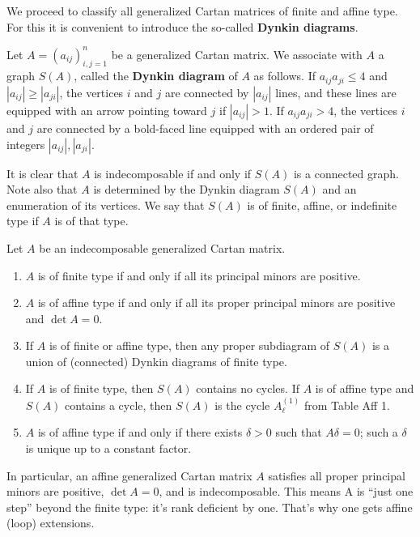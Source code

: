 \documentclass[12pt]{article}
\begin{document}
We proceed to classify all generalized Cartan matrices of finite and affine type.
For this it is convenient to introduce the so-called \textbf{Dynkin diagrams}.
\begin{definition}
    Let $A=(a_{ij})_{i,j=1}^n$ be a generalized Cartan matrix.  We associate with $A$ a graph $S(A)$, called the \textbf{Dynkin diagram} of $A$ as follows. If $a_{ij}a_{ji}\leq 4$ and $|a_{ij}|\geq |a_{ji}|$, the vertices $i$ and $j$ are connected by $|a_{ij}|$ lines, and these lines are equipped with an arrow pointing toward $j$ if $|a_{ij}|>1$.
    If $a_{ij}a_{ji}>4$, the vertices $i$ and $j$ are connected by a bold-faced line
    equipped with an ordered pair of integers $|a_{ij}|,|a_{ji}|$.
\end{definition}

It is clear that $A$ is indecomposable if and only if $S(A)$ is a connected graph. Note also that $A$ is determined by the Dynkin diagram $S(A)$ and an enumeration of its vertices.
We say that $S(A)$ is of finite, affine, or indefinite type if $A$ is of that type.

\begin{proposition}\label{prop:finite-affine}
    Let $A$ be an indecomposable generalized Cartan matrix.
    \begin{enumerate}[label=\alph*)]
        \item $A$ is of finite type if and only if all its principal minors are positive.
        \item $A$ is of affine type if and only if all its proper principal minors are positive and $\det A = 0$.
        \item If $A$ is of finite or affine type, then any proper subdiagram of $S(A)$ is a union of (connected) Dynkin diagrams of finite type.
        \item If $A$ is of finite type, then $S(A)$ contains no cycles.
              If $A$ is of affine type and $S(A)$ contains a cycle, then $S(A)$ is the cycle $A_\ell^{(1)}$ from Table Aff 1.
        \item $A$ is of affine type if and only if there exists $\delta>0$ such that $A\delta=0$;
              such a $\delta$ is unique up to a constant factor.
    \end{enumerate}
\end{proposition}
In particular, an affine generalized Cartan matrix $A$ satisfies all proper principal minors are positive, $\det A = 0$, and is indecomposable. This means A is “just one step” beyond the finite type: it's rank deficient by one. That's why one gets affine (loop) extensions.
\end{document}
